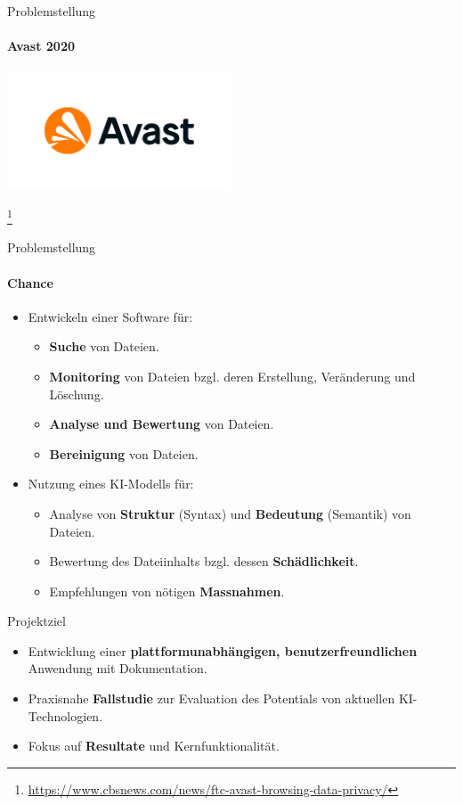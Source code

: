 \documentclass[
    ngerman,%
    authorontitle=true,
]{bfhbeamer}
\begin{document}
    \begin{frame}{Problemstellung}
        \framesubtitle{Avast 2020}
        \begin{center}
            \includegraphics[width=0.5\textwidth]{assets/presentation/avast-logo}
        \end{center}
        \footnote{\url{https://www.cbsnews.com/news/ftc-avast-browsing-data-privacy/}}
    \end{frame}

    \begin{frame}{Problemstellung}
        \framesubtitle{Chance}
        \begin{itemize}
            \item Entwickeln einer Software f\"ur:
            \begin{itemize}
                \item \textbf{Suche} von Dateien.
                \item \textbf{Monitoring} von Dateien bzgl. deren Erstellung, Ver\"anderung und L\"oschung.
                \item \textbf{Analyse und Bewertung} von Dateien.
                \item \textbf{Bereinigung} von Dateien.
            \end{itemize}
            \item Nutzung eines KI-Modells f\"ur:
            \begin{itemize}
                \item Analyse von \textbf{Struktur} (Syntax) und \textbf{Bedeutung} (Semantik) von Dateien.
                \item Bewertung des Dateiinhalts bzgl.
                dessen \textbf{Schädlichkeit}.
                \item Empfehlungen von n\"otigen \textbf{Massnahmen}.
            \end{itemize}
        \end{itemize}
    \end{frame}

    \begin{frame}{Projektziel}
        \begin{itemize}
            \item Entwicklung einer \textbf{plattformunabh\"angigen, benutzerfreundlichen} Anwendung mit Dokumentation.
            \item Praxisnahe \textbf{Fallstudie} zur Evaluation des Potentials von aktuellen KI-Technologien.
            \item Fokus auf \textbf{Resultate} und Kernfunktionalit\"at.
        \end{itemize}
    \end{frame}
\end{document}
